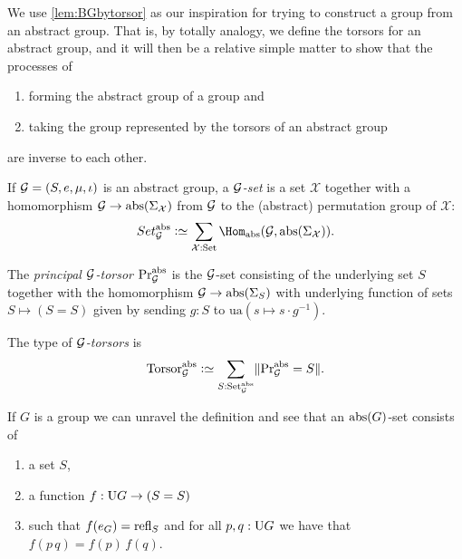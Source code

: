 We use \cref{lem:BGbytorsor} as our inspiration for trying to construct a group from an abstract group.
That is, by totally analogy, we define the torsors for an abstract group,
and it will then be a relative simple matter to show that the processes of
\begin{enumerate}
\item forming the abstract group of a group and
\item taking the group represented by the torsors of an abstract group
\end{enumerate}
 are inverse to each other.
\begin{definition}
\label{def:abstrGtorsors}
  If ${\mathcal G}=(S,e,\mu,\iota)$ is an abstract group, a \emph{$\mathcal G$-set} is a set $\mathcal X$ together with a homomorphism
$\mathcal G\to\mathrm{abs}(\Sigma_{\mathcal X})$
from $\mathcal G$ to the (abstract) permutation group of $\mathcal X$:
$$Set_{\agp G}^\abstr\defequi \sum_{\mathcal X:\Set}\Hom_\abstr({\agp G},\abstr(\Sigma_{\mathcal X})).$$

The \emph{principal ${\mathcal G}$-torsor} $\mathrm{Pr}_{{\mathcal G}}^{\mathrm{abs}}$ is the ${\mathcal G}$-set consisting of the underlying set $S$ together with the homomorphism ${\mathcal G}\to\mathrm{abs}(\Sigma_{S})$ with underlying function of sets $S\mapsto (S=S)$ given by sending $g:S$ to $\mathrm{ua}(s\mapsto s\cdot g^{-1})$.

The type of \emph{${\mathcal G}$-torsors} is
$$\typetorsor_{\agp G}^\abstr\defequi\sum_{S:\Set_{\agp G}^\abstr}\Trunc{\princ {\agp G}^\abstr=S}.$$
\end{definition}
\begin{example}
  If $G$ is a group we can unravel the definition and see that an $\mathrm{abs}(G)$-set consists of
  \begin{enumerate}
  \item a set $S$,
  \item a function $f:\mathrm{U} G\to (S=S)$
  \item such that $f(e_G)=\mathrm{refl}_{S}$ and for all $p,q:\mathrm{U} G$ we have that $f(p\, q)=f(p)\,f(q)$.
  \end{enumerate}

\end{example}


